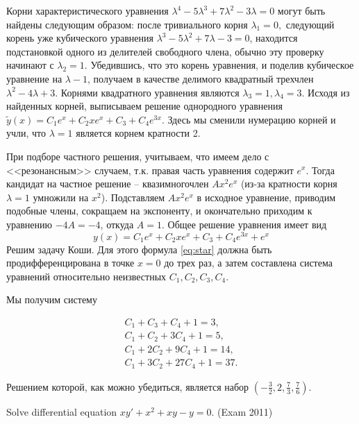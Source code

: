 \begin{solution}
Корни характеристического уравнения $\lambda ^{4} -5\lambda ^{3} +7\lambda ^{2} -3\lambda =0$ могут быть найдены следующим образом: после тривиального корня $\lambda _{1} =0, $ следующий корень уже кубического уравнения $\lambda ^{3} -5\lambda ^{2} +7\lambda -3=0$, находится подстановкой одного из делителей свободного члена, обычно эту проверку начинают с $\lambda _{2} =1$. Убедившись, что это корень уравнения, и поделив кубическое уравнение на $\lambda -1$, получаем в качестве делимого квадратный трехчлен $\lambda ^{2} -4\lambda +3$. Корнями квадратного уравнения являются $\lambda _{3} =1, \lambda _{4} =3$. Исходя из найденных корней, выписываем решение однородного уравнения $\tilde{y}(x)=C_{1} e^{x} +C_{2} xe^{x} +C_{3} +C_{4} e^{3x} $. Здесь мы сменили нумерацию корней и учли, что $\lambda =1$ является корнем кратности 2. 

При подборе частного решения, учитываем, что имеем дело с <<резонансным>> случаем, т.к. правая часть уравнения  содержит $e^{x} $. Тогда кандидат на частное решение -- квазимногочлен $Ax^{2} e^{x} $ (из-за кратности корня $\lambda =1$ умножили на $x^{2} $). Подставляем $Ax^{2} e^{x} $ в исходное уравнение, приводим подобные члены, сокращаем на экспоненту, и окончательно приходим к уравнению $-4A=-4$, откуда $A=1$. Общее решение уравнения  имеет вид 
\begin{equation} \label{eq:star}  
y(x)=C_{1} e^{x} +C_{2} xe^{x} +C_{3} +C_{4} e^{3x} +e^{x}
\end{equation} 
Решим задачу Коши. Для этого формула \ref{eq:star} должна быть продифференцирована в точке $x=0$ до трех раз, а затем составлена система уравнений относительно неизвестных $C_{1} , C_{2} , C_{3} , C_{4} $.

Мы получим систему

\[\begin{array}{c} {C_{1} +C_{3} +C_{4} +1=3,} \\ {C_{1} +C_{2} +3C_{4} +1=5,} \\ {C_{1} +2C_{2} +9C_{4} +1=14,} \\ {C_{1} +3C_{2} +27C_{4} +1=37.} \end{array}\] 

Решением которой, как можно убедиться, является набор $\left(-\frac{3}{2} ,2,\frac{7}{3} ,\frac{7}{6} \right)$.
\end{solution}

\begin{problem}
Solve differential equation $xy'+x^{2} +xy-y=0$. (Exam 2011)
\end{problem}

